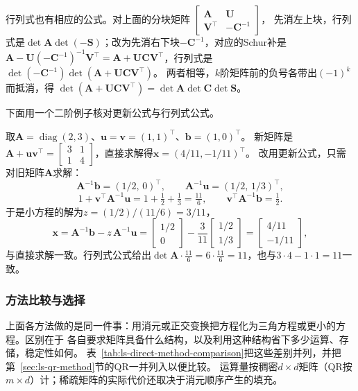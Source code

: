 行列式也有相应的公式。对上面的分块矩阵
$\left[\begin{smallmatrix}\bm A&\bm U\\\bm V^\top&-\bm C^{-1}\end{smallmatrix}\right]$，
先消左上块，行列式是$\det\bm A\det(-\bm S)$；改为先消右下块$-\bm C^{-1}$，对应的Schur补是
$\bm A-\bm U(-\bm C^{-1})^{-1}\bm V^\top=\bm A+\bm U\bm C\bm V^\top$，行列式是$\det(-\bm C^{-1})\det(\bm A+\bm U\bm C\bm V^\top)$。
两者相等，$k$阶矩阵前的负号各带出$(-1)^k$而抵消，得
$\det(\bm A+\bm U\bm C\bm V^\top)=\det\bm A\det\bm C\det\bm S$。

下面用一个二阶例子核对更新公式与行列式公式。

\begin{example}[秩一更新的求解]
\label{ex:ls-sherman-morrison-update}
取$\bm A=\operatorname{diag}(2,3)$、$\bm u=\bm v=(1,1)^\top$、$\bm b=(1,0)^\top$。
新矩阵是$\bm A+\bm u\bm v^\top=\left[\begin{smallmatrix}3&1\\1&4\end{smallmatrix}\right]$，直接求解得$\bm x=(4/11,-1/11)^\top$。
改用更新公式，只需对旧矩阵$\bm A$求解：
\[
 \bm A^{-1}\bm b=(1/2,\,0)^\top,\qquad
 \bm A^{-1}\bm u=(1/2,\,1/3)^\top,
\]
\[
 1+\bm v^\top\bm A^{-1}\bm u=1+\tfrac12+\tfrac13=\tfrac{11}6,\qquad
 \bm v^\top\bm A^{-1}\bm b=\tfrac12 .
\]
于是小方程的解为$z=(1/2)/(11/6)=3/11$，
\[
 \bm x=\bm A^{-1}\bm b-z\,\bm A^{-1}\bm u
 =\begin{bmatrix}1/2\\0\end{bmatrix}-\frac3{11}\begin{bmatrix}1/2\\1/3\end{bmatrix}
 =\begin{bmatrix}4/11\\-1/11\end{bmatrix},
\]
与直接求解一致。行列式公式给出$\det\bm A\cdot\tfrac{11}6=6\cdot\tfrac{11}6=11$，也与$3\cdot4-1\cdot1=11$一致。
\end{example}

\subsubsection{方法比较与选择}
\label{sec:ls-direct-method-comparison}

上面各方法做的是同一件事：用消元或正交变换把方程化为三角方程或更小的方程。区别在于
各自要求矩阵具备什么结构，以及利用这种结构省下多少运算、存储，稳定性如何。
表~\ref{tab:ls-direct-method-comparison}把这些差别并列，并把第~\ref{sec:ls-qr-method}节的QR一并列入以便比较。
运算量按稠密$d\times d$矩阵（QR按$m\times d$）计；稀疏矩阵的实际代价还取决于消元顺序产生的填充。


